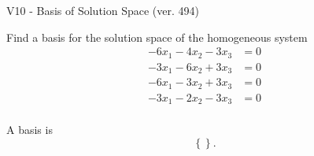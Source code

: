 \begin{exercise}
  \begin{exerciseTitle}V10 - Basis of Solution Space (ver. 494)\end{exerciseTitle}
  \begin{exerciseStatement}
    Find a basis for the solution space of the homogeneous system 
\begin{align*}
 -6 x_ 1 -4 x_ 2 -3 x_ 3 &= 0  \\ 
  -3 x_ 1 -6 x_ 2 + 3 x_ 3 &= 0  \\ 
  -6 x_ 1 -3 x_ 2 + 3 x_ 3 &= 0  \\ 
  -3 x_ 1 -2 x_ 2 -3 x_ 3 &= 0  \\ 
 \end{align*}


 
  \end{exerciseStatement}

  \begin{exerciseAnswer}
   A basis is   
\[\left\{\right\}.\]

  


  \end{exerciseAnswer}
\end{exercise}